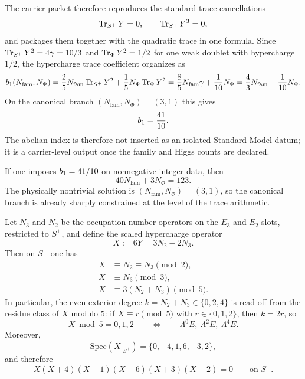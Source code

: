 The carrier packet therefore reproduces the standard trace cancellations
\[
\operatorname{Tr}_{S^+}Y=0,
\qquad
\operatorname{Tr}_{S^+}Y^3=0,
\]
and packages them together with the quadratic trace in one formula. Since $\operatorname{Tr}_{S^+}Y^2=4\gamma=10/3$ and $\operatorname{Tr}_\Phi Y^2=1/2$ for one weak doublet with hypercharge $1/2$, the hypercharge trace coefficient organizes as
\begin{equation}
\label{eq:abelian-index}
b_1(N_{\mathrm{fam}},N_\Phi)
=
\frac25N_{\mathrm{fam}}\operatorname{Tr}_{S^+}Y^2+\frac15N_\Phi\operatorname{Tr}_\Phi Y^2
=
\frac85N_{\mathrm{fam}}\gamma+\frac1{10}N_\Phi
=
\frac43N_{\mathrm{fam}}+\frac1{10}N_\Phi.
\end{equation}
On the canonical branch $(N_{\mathrm{fam}},N_\Phi)=(3,1)$ this gives
\[
b_1=\frac{41}{10}.
\]
The abelian index is therefore not inserted as an isolated Standard Model datum; it is a carrier-level output once the family and Higgs counts are declared.

\begin{remark}
If one imposes $b_1=41/10$ on nonnegative integer data, then
\[
40N_{\mathrm{fam}}+3N_\Phi=123.
\]
The physically nontrivial solution is $(N_{\mathrm{fam}},N_\Phi)=(3,1)$, so the canonical branch is already sharply constrained at the level of the trace arithmetic.
\end{remark}

\begin{proposition}
\label{prop:family-hypercharge-compression}
Let $N_3$ and $N_2$ be the occupation-number operators on the $E_3$ and $E_2$ slots, restricted to $S^+$, and define the scaled hypercharge operator
\[
X:=6Y=3N_2-2N_3.
\]
Then on $S^+$ one has
\begin{align}
X&\equiv N_2\equiv N_3 \pmod 2,\label{eq:x-mod-2}\\
X&\equiv N_3 \pmod 3,\label{eq:x-mod-3}\\
X&\equiv 3(N_2+N_3) \pmod 5.\label{eq:x-mod-5}
\end{align}
In particular, the even exterior degree $k=N_2+N_3\in\{0,2,4\}$ is read off from the residue class of $X$ modulo $5$: if $X\equiv r\pmod 5$ with $r\in\{0,1,2\}$, then $k=2r$, so
\[
X\bmod 5=0,1,2
\qquad\Longleftrightarrow\qquad
\Lambda^0E,\ \Lambda^2E,\ \Lambda^4E.
\]
Moreover,
\[
\mathrm{Spec}(X|_{S^+})=\{0,-4,1,6,-3,2\},
\]
and therefore
\begin{equation}
\label{eq:family-x-polynomial}
X(X+4)(X-1)(X-6)(X+3)(X-2)=0
\qquad\text{on }S^+.
\end{equation}
\end{proposition}


